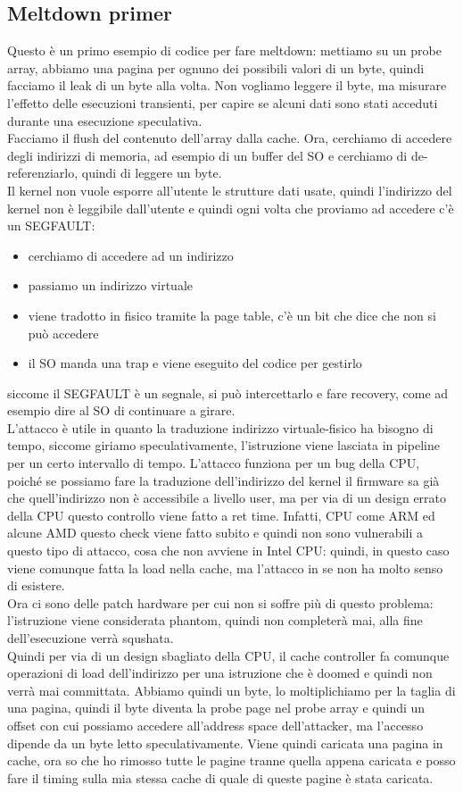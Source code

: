 \documentclass[12pt, oneside]{extbook} %
\begin{document}
\subsection{Meltdown primer}
Questo è un primo esempio di codice per fare meltdown:
mettiamo su un probe array, abbiamo una pagina per ognuno dei possibili valori di un byte, quindi facciamo il leak di un byte alla volta. Non vogliamo leggere il byte, ma misurare l'effetto delle esecuzioni transienti, per capire se alcuni dati sono stati acceduti durante una esecuzione speculativa.\\ Facciamo il flush del contenuto dell'array dalla cache. Ora, cerchiamo di accedere degli indirizzi di memoria, ad esempio di un buffer del SO e cerchiamo di de-referenziarlo, quindi di leggere un byte.\\ Il kernel non vuole esporre all'utente le strutture dati usate, quindi l'indirizzo del kernel non è leggibile dall'utente e quindi ogni volta che proviamo ad accedere c'è un SEGFAULT:
\begin{itemize}
\item cerchiamo di accedere ad un indirizzo
\item passiamo un indirizzo virtuale
\item viene tradotto in fisico tramite la page table, c'è un bit che dice che non si può accedere
\item il SO manda una trap e viene eseguito del codice per gestirlo
\end{itemize}
siccome il SEGFAULT è un segnale, si può intercettarlo e fare recovery, come ad esempio dire al SO di continuare a girare.\\ L'attacco è utile in quanto la traduzione indirizzo virtuale-fisico ha bisogno di tempo, siccome giriamo speculativamente, l'istruzione viene lasciata in pipeline per un certo intervallo di tempo. L'attacco funziona per un bug della CPU, poiché se possiamo fare la traduzione dell'indirizzo del kernel il firmware sa già che quell'indirizzo non è accessibile a livello user, ma per via di un design errato della CPU questo controllo viene fatto a ret time. Infatti, CPU come ARM ed alcune AMD questo check viene fatto subito e quindi non sono vulnerabili a questo tipo di attacco, cosa che non avviene in Intel CPU: quindi, in questo caso viene comunque fatta la load nella cache, ma l'attacco in se non ha molto senso di esistere.\\ Ora ci sono delle patch hardware per cui non si soffre più di questo problema: l'istruzione viene considerata phantom, quindi non completerà mai, alla fine dell'esecuzione verrà squshata.\\ Quindi per via di un design sbagliato della CPU, il cache controller fa comunque operazioni di load dell'indirizzo per una istruzione che è doomed e quindi non verrà mai committata. Abbiamo quindi un byte, lo moltiplichiamo per la taglia di una pagina, quindi il byte diventa la probe page nel probe array e quindi un offset con cui possiamo accedere all'address space dell'attacker, ma l'accesso dipende da un byte letto speculativamente. Viene quindi caricata una pagina in cache, ora so che ho rimosso tutte le pagine tranne quella appena caricata e posso fare il timing sulla mia stessa cache di quale di queste pagine è stata caricata.
\end{document}
